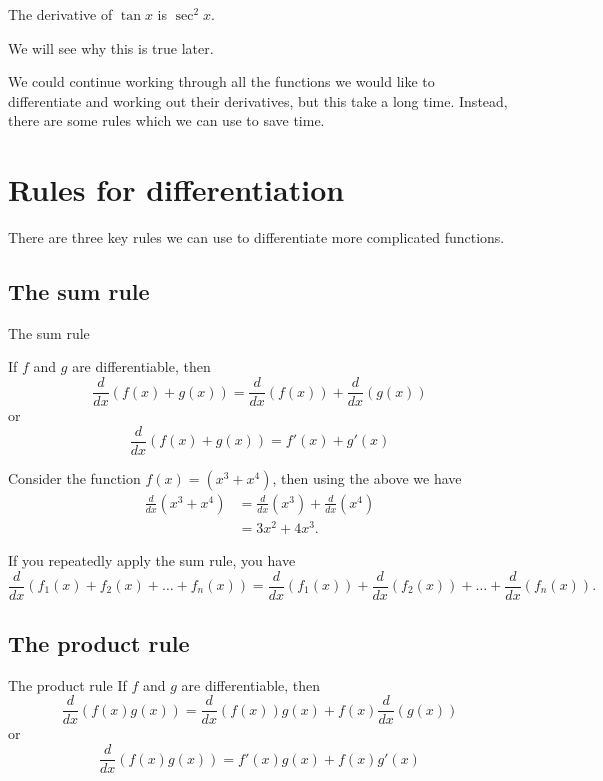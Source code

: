 \begin{in_a_box}
The derivative of $\tan x$ is $\sec^2 x$.

We will see why this is true later.
\end{in_a_box}

We could continue working through all the functions we would like to differentiate and working out their derivatives, but this take a long time. Instead, there are some rules which we can use to save time.

\section{Rules for differentiation}
There are three key rules we can use to differentiate more complicated functions.

\subsection{The sum rule}
\begin{thing}{The sum rule}

If $f$ and $g$ are differentiable, then
\[\frac{d}{dx}\left( f(x)+g(x)\right)=\frac{d}{dx}\left(f(x)\right)+\frac{d}{dx}\left(g(x)\right)\]
or\[\frac{d}{dx}\left( f(x)+g(x)\right)=f'(x)+g'(x) \]
\end{thing}

\begin{example}
Consider the function $f(x)=\left( x^3+x^4\right)$, then using the above we have
\begin{align*} \frac{d}{dx}\left( x^3+x^4\right)&=\frac{d}{dx}\left( x^3\right)+\frac{d}{dx}\left(x^4\right)\\&=3x^2+4x^3.\end{align*}
\end{example}

If you repeatedly apply the sum rule, you have
\begin{equation*}
\frac{d}{dx}\left( f_1(x) +f_2(x)+\dots +f_n(x)\right)=\frac{d}{dx}\left( f_1(x)\right)+\frac{d}{dx}\left( f_2(x)\right)+\dots +\frac{d}{dx}\left( f_n(x)\right). 
\end{equation*}

\subsection{The product rule}
\begin{thing}{The product rule}
If $f$ and $g$ are differentiable, then
\[\frac{d}{dx}\left( f(x)g(x) \right) = \frac{d}{dx}\left(f(x)\right)g(x) + f(x)\frac{d}{dx}\left(g(x)\right)\]
or
\[\frac{d}{dx}\left( f(x)g(x) \right) = f'(x)g(x) + f(x)g'(x)\]
\end{thing}

